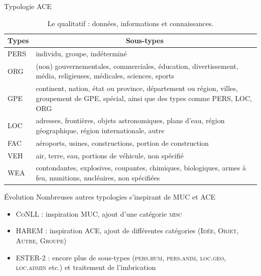\documentclass[xetex,xcolor={table,usenames,dvipsnames}]{beamer}
\begin{document}
\begin{frame}{Typologie \textsc{ACE}}
		\begin{table}[h]
		\centering
		\scriptsize
		\begin{tabularx}{\textwidth}{|X|X|}
			\hline
			\multicolumn{1}{|c}{\textbf{Types}} & \multicolumn{1}{|c|}{\textbf{Sous-types}} \\
			\hline
			\textsc{PERS} & individu, groupe, indéterminé \\ \hline
			\textsc{ORG} & (non) gouvernementales, commerciales, éducation, divertissement, média, religieuses, médicales, sciences, sports \\
			\hline
			\textsc{GPE} & continent, nation, état ou province, département ou région, villes, groupement de \textsc{GPE}, spécial, ainsi que des types comme \textsc{PERS}, \textsc{LOC}, \textsc{ORG} \\
			\hline
			\textsc{LOC} & adresses, frontières, objets astronomiques, plans d'eau, région géographique, région internationale, autre\\
			\hline
			\textsc{FAC} & aéroports, usines, constructions, portion de construction\\
			\hline
			\textsc{VEH} & air, terre, eau, portions de véhicule, non spécifié\\
			\hline
			\textsc{WEA} & contondantes, explosives, coupantes, chimiques, biologiques, armes à feu, munitions, nucléaires, non spécifiées\\
			\hline
		\end{tabularx}
		\caption{Le qualitatif : données, informations et connaissances.}
	\end{table}
\end{frame}

\begin{frame}{Évolution}
	Nombreuses autres typologies s'inspirant de \textsc{MUC} et \textsc{ACE}
	\begin{itemize}
		\item \textsc{CoNLL} : inspiration \textsc{MUC}, ajout d'une catégorie \textsc{misc}
		\item \textsc{HAREM} : inspiration \textsc{ACE}, ajout de différentes catégories (\textsc{Idée}, \textsc{Objet}, \textsc{Autre}, \textsc{Groupe})
		\item \textsc{ESTER-2} : encore plus de sous-types (\textsc{pers.hum}, \textsc{pers.anim}, \textsc{loc.geo}, \textsc{loc.admin} etc.) et traitement de l'imbrication
	\end{itemize}
\end{frame}
\end{document}
